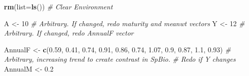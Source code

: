\documentclass[
]{krantz}
\makeatletter
\newenvironment{Shaded}{\begin{snugshade}}{\end{snugshade}}
\newcommand{\AttributeTok}[1]{\textcolor[rgb]{0.27,0.27,0.27}{#1}}
\newcommand{\CommentTok}[1]{\textcolor[rgb]{0.37,0.37,0.37}{\textit{#1}}}
\newcommand{\DecValTok}[1]{\textcolor[rgb]{0.06,0.06,0.06}{#1}}
\newcommand{\FloatTok}[1]{\textcolor[rgb]{0.06,0.06,0.06}{#1}}
\newcommand{\FunctionTok}[1]{\textcolor[rgb]{0.27,0.27,0.27}{\textbf{#1}}}
\newcommand{\NormalTok}[1]{#1}
\newcommand{\OtherTok}[1]{\textcolor[rgb]{0.37,0.37,0.37}{#1}}
\newenvironment{kframe}{%
\medskip{}
\setlength{\fboxsep}{.8em}
 \def\at@end@of@kframe{}%
 \ifinner\ifhmode%
  \def\at@end@of@kframe{\end{minipage}}%
  \begin{minipage}{\columnwidth}%
 \fi\fi%
 \def\FrameCommand##1{\hskip\@totalleftmargin \hskip-\fboxsep
 \colorbox{shadecolor}{##1}\hskip-\fboxsep
     \hskip-\linewidth \hskip-\@totalleftmargin \hskip\columnwidth}%
 \MakeFramed {\advance\hsize-\width
   \@totalleftmargin\z@ \linewidth\hsize
   \@setminipage}}%
 {\par\unskip\endMakeFramed%
 \at@end@of@kframe}
\renewenvironment{Shaded}{\begin{kframe}}{\end{kframe}}
\makeatother
\begin{document}
\begin{Shaded}
\begin{Highlighting}[]
\FunctionTok{rm}\NormalTok{(}\AttributeTok{list=}\FunctionTok{ls}\NormalTok{()) }\CommentTok{\# Clear Environment}

\NormalTok{A }\OtherTok{\textless{}{-}} \DecValTok{10} \CommentTok{\# Arbitrary. If changed, redo maturity and meanwt vectors}
\NormalTok{Y }\OtherTok{\textless{}{-}} \DecValTok{12} \CommentTok{\# Arbitrary. If changed, redo AnnualF vector}

\NormalTok{AnnualF }\OtherTok{\textless{}{-}} \FunctionTok{c}\NormalTok{(}\FloatTok{0.59}\NormalTok{, }\FloatTok{0.41}\NormalTok{, }\FloatTok{0.74}\NormalTok{, }\FloatTok{0.91}\NormalTok{, }\FloatTok{0.86}\NormalTok{, }\FloatTok{0.74}\NormalTok{, }\FloatTok{1.07}\NormalTok{, }\FloatTok{0.9}\NormalTok{, }\FloatTok{0.87}\NormalTok{,}
             \FloatTok{1.1}\NormalTok{, }\FloatTok{0.93}\NormalTok{)}
\CommentTok{\# Arbitrary, increasing trend to create contrast in SpBio.}
\CommentTok{\# Redo if Y changes}
\NormalTok{AnnualM }\OtherTok{\textless{}{-}} \FloatTok{0.2}


\end{Highlighting}
\end{Shaded}
\end{document}
